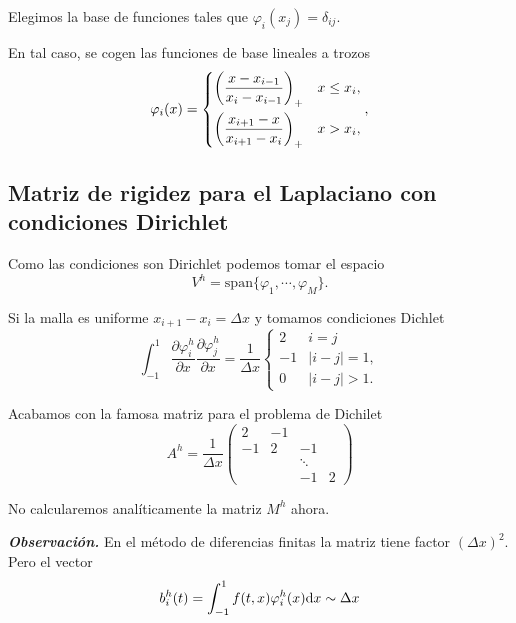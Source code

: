 Elegimos la base de funciones tales que
\(\varphi_i(x_j) = \delta_{ij}\).



En tal caso, se cogen las funciones de base lineales a trozos \[
    \varphi_i (x)
    =
    \begin{dcases}
        \left( \frac{x-x_{i-1}}{x_i - x_{i-1}} \right)_+ & x \le x_i , \\
        \left( \frac{x_{i+1}-x}{x_{i+1} - x_i} \right)_+ & x > x_i ,   \\
    \end{dcases},
\]

\subsection{Matriz de rigidez para el Laplaciano con condiciones
    Dirichlet
}\label{matriz-de-rigidez-para-el-laplaciano-con-condiciones-dirichlet-scrollable}

Como las condiciones son Dirichlet podemos tomar el espacio \[
    V^h = \mathrm{span} \{ \varphi_1, \cdots, \varphi_M \}.
\]

Si la malla es uniforme \(x_{i+1} - x_i = \Delta x\) y tomamos
condiciones Dichlet \[
    \int_{-1}^1 \frac{\partial \varphi_i^h}{\partial x} \frac{\partial \varphi_j^h}{\partial x}
    =
    \frac 1 {\Delta x}
    \begin{cases}
        2    & i = j      \\
        {-1} & |i-j| = 1, \\
        0    & |i-j| > 1.
    \end{cases}
\]



Acabamos con la famosa matriz para el problema de Dichilet \[
    A^h = \frac{1}{\Delta x}
    \begin{pmatrix}
        2  & - 1 &            \\
        -1 & 2   & -1         \\
           &     & \ddots     \\
           &     & -1     & 2
    \end{pmatrix}
\]



No calcularemos analíticamente la matriz \(M^h\) ahora.



\textbf{\emph{Observación.}} En el método de diferencias finitas la
matriz tiene factor \((\Delta x)^2\). Pero el vector \[
    b_i^h(t) = \int_{-1}^1 f(t,x) \varphi_i^h(x) \mathrm{d} x \sim \Delta x
\]

